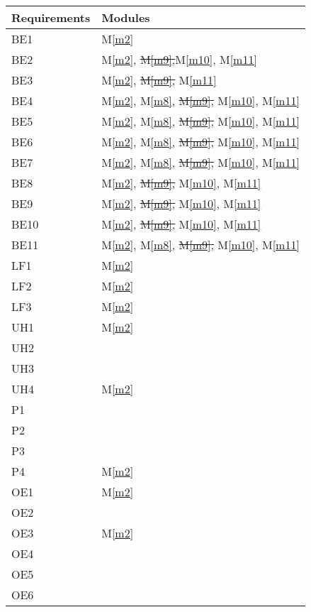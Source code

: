 \documentclass[12pt, titlepage]{article}
\newcommand{\mref}[1]{M\ref{#1}}
\begin{document}
\begin{table}[H]
    \centering
    \begin{tabular}{p{} p{}}
        \toprule
        \textbf{Requirements} & \textbf{Modules}\\
        \midrule
        BE1 & \mref{m2}\\
        BE2 & \mref{m2}, \sout{\mref{m9},}\mref{m10}, \mref{m11}\\
        BE3 & \mref{m2}, \sout{\mref{m9},} \mref{m11}\\
        BE4 & \mref{m2}, \mref{m8}, \sout{\mref{m9},} \mref{m10}, \mref{m11}\\
        BE5 & \mref{m2}, \mref{m8}, \sout{\mref{m9},} \mref{m10}, \mref{m11}\\
        BE6 & \mref{m2}, \mref{m8}, \sout{\mref{m9},} \mref{m10}, \mref{m11}\\
        BE7 & \mref{m2}, \mref{m8}, \sout{\mref{m9},} \mref{m10}, \mref{m11}\\
        BE8 & \mref{m2}, \sout{\mref{m9},} \mref{m10}, \mref{m11}\\
        BE9 & \mref{m2}, \sout{\mref{m9},} \mref{m10}, \mref{m11}\\
        BE10 & \mref{m2}, \sout{\mref{m9},} \mref{m10}, \mref{m11}\\
        BE11 & \mref{m2}, \mref{m8}, \sout{\mref{m9},} \mref{m10}, \mref{m11}\\
        LF1 & \mref{m2}\\
        LF2 & \mref{m2}\\
        LF3 & \mref{m2}\\
        UH1 & \mref{m2}\\
        UH2 & ~\\
        UH3 & ~\\
        UH4 & \mref{m2}\\
        P1 & ~\\
        P2 & ~\\
        P3 & ~\\
        P4 & \mref{m2}\\
        OE1 & \mref{m2}\\
        OE2 & ~\\
        OE3 & \mref{m2}\\
        OE4 & ~\\
        OE5 & ~\\
        OE6 & ~\\

\end{tabular}
\end{table}
\end{document}
